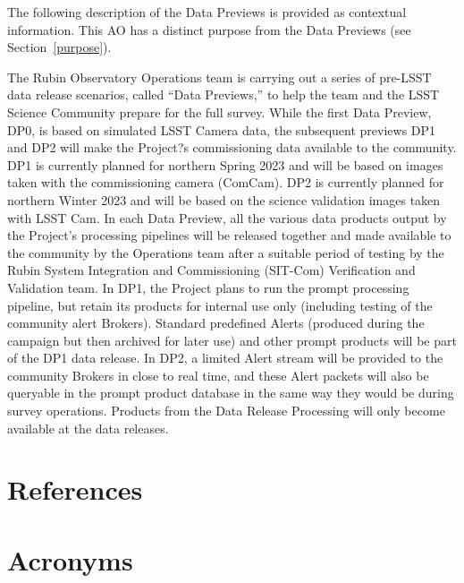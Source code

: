 \documentclass[SE,authoryear,toc]{lsstdoc}
\begin{document}
The following description of the Data Previews is provided as contextual information. This AO has a distinct purpose from the Data Previews (see Section~\ref{purpose}).

The Rubin Observatory Operations team is carrying out a series of pre-LSST data release scenarios, called ``Data Previews,'' to help the team and the LSST Science Community prepare for the full survey. While the first Data Preview, DP0, is based on simulated LSST Camera data, the subsequent previews DP1 and DP2 will make the Project?s commissioning data available to the community. DP1 is currently planned for northern Spring 2023 and will be based on images taken with the commissioning camera (ComCam). DP2 is currently planned for northern Winter 2023 and will be based on the science validation images taken with LSST Cam. In each Data Preview, all the various data products output by the Project's processing pipelines will be released together and made available to the community by the  Operations team after a suitable period of testing by the Rubin System Integration and Commissioning (SIT-Com) Verification and Validation team. In DP1, the Project plans to run the prompt processing pipeline, but retain its products for internal use only (including testing of the community alert Brokers). Standard predefined Alerts (produced during the campaign but then archived for later use) and other prompt products will be part of the DP1 data release. In DP2, a limited Alert stream will be provided to the community Brokers in close to real time, and these Alert packets will also be queryable in the prompt product database in the same way they would be during survey operations. Products from the Data Release Processing will only become available at the data releases. 

\section{References} \label{sec:bib}
\renewcommand{\refname}{} %


\section{Acronyms} \label{sec:acronyms}

\end{document}
